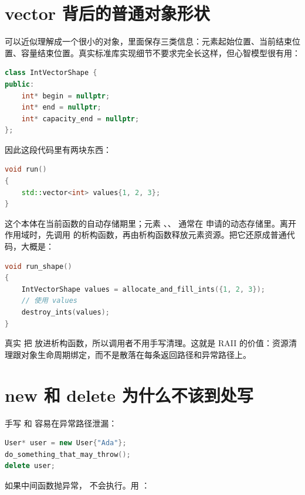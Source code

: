 \section{vector 背后的普通对象形状}

 可以近似理解成一个很小的对象，里面保存三类信息：元素起始位置、当前结束位置、容量结束位置。真实标准库实现细节不要求完全长这样，但心智模型很有用：

\begin{lstlisting}[language=C++,caption={vector 的近似本体}]
class IntVectorShape {
public:
    int* begin = nullptr;
    int* end = nullptr;
    int* capacity_end = nullptr;
};
\end{lstlisting}

因此这段代码里有两块东西：

\begin{lstlisting}[language=C++,caption={对象本体和元素资源分离}]
void run()
{
    std::vector<int> values{1, 2, 3};
}
\end{lstlisting}

 这个本体在当前函数的自动存储期里；元素 、、 通常在  申请的动态存储里。离开作用域时，先调用  的析构函数，再由析构函数释放元素资源。把它还原成普通代码，大概是：

\begin{lstlisting}[language=C++,caption={RAII 的普通代码形状}]
void run_shape()
{
    IntVectorShape values = allocate_and_fill_ints({1, 2, 3});
    // 使用 values
    destroy_ints(values);
}
\end{lstlisting}

真实  把  放进析构函数，所以调用者不用手写清理。这就是 RAII 的价值：资源清理跟对象生命周期绑定，而不是散落在每条返回路径和异常路径上。

\section{new 和 delete 为什么不该到处写}

手写  和  容易在异常路径泄漏：

\begin{lstlisting}[language=C++,caption={手写 delete 容易遗漏}]
User* user = new User{"Ada"};
do_something_that_may_throw();
delete user;
\end{lstlisting}

如果中间函数抛异常， 不会执行。用 ：

